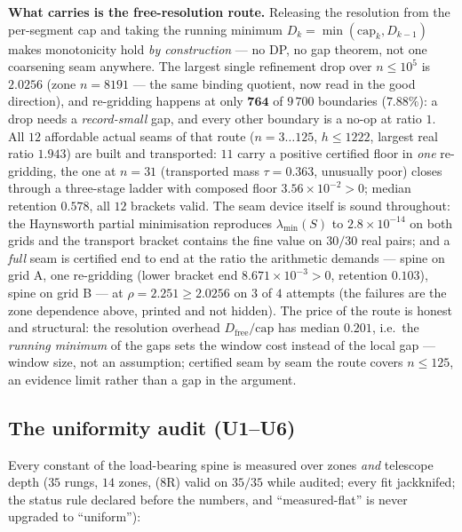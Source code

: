 \documentclass[11pt,a4paper]{article}
\begin{document}
\noindent\textbf{What carries is the free-resolution route.} Releasing the resolution from the
per-segment cap and taking the running minimum $D_k=\min(\mathrm{cap}_k,D_{k-1})$ makes monotonicity
hold \emph{by construction} --- no DP, no gap theorem, not one coarsening seam anywhere. The largest
single refinement drop over $n\le10^{5}$ is $2.0256$ (zone $n=8191$ --- the same binding quotient,
now read in the good direction), and re-gridding happens at only $\mathbf{764}$ of $9\,700$
boundaries ($7.88\%$): a drop needs a \emph{record-small} gap, and every other boundary is a no-op at
ratio $1$. All $12$ affordable actual seams of that route ($n=3\ldots125$, $h\le1222$, largest real
ratio $1.943$) are built and transported: $11$ carry a positive certified floor in \emph{one}
re-gridding, the one at $n=31$ (transported mass $\tau=0.363$, unusually poor) closes through a
three-stage ladder with composed floor $3.56\times10^{-2}>0$; median retention $0.578$, all $12$
brackets valid. The seam device itself is sound throughout: the Haynsworth partial minimisation
reproduces $\lambda_{\min}(S)$ to $2.8\times10^{-14}$ on both grids and the transport bracket
contains the fine value on $30/30$ real pairs; and a \emph{full} seam is certified end to end at the
ratio the arithmetic demands --- spine on grid A, one re-gridding (lower bracket end
$8.671\times10^{-3}>0$, retention $0.103$), spine on grid B --- at $\rho=2.251\ge2.0256$ on $3$ of
$4$ attempts (the failures are the zone dependence above, printed and not hidden). The price of the
route is honest and structural: the resolution overhead $D_{\mathrm{free}}/\mathrm{cap}$ has median
$0.201$, i.e.\ the \emph{running minimum} of the gaps sets the window cost instead of the local gap
--- window size, not an assumption; certified seam by seam the route covers $n\le125$, an evidence
limit rather than a gap in the argument.

\subsection{The uniformity audit (U1--U6)}
Every constant of the load-bearing spine is measured over zones \emph{and} telescope depth ($35$
rungs, $14$ zones, (8R) valid on $35/35$ while audited; every fit jackknifed; the status rule
declared before the numbers, and ``measured-flat'' is never upgraded to ``uniform''):
\end{document}
